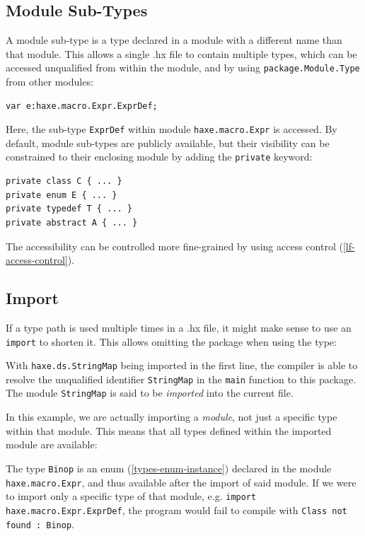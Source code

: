 \documentclass[a4paper,oneside]{book}
\newcommand{\type}[1]{\texttt{#1}}
\newcommand{\expr}[1]{\texttt{#1}}
\newcommand{\tref}[2]{#1 (\ref{#2})}
\newcommand{\haxe}[2][]{%
}
\begin{document}
\subsection{Module Sub-Types}
\label{type-systemmodule-sub-types}

A module sub-type is a type declared in a module with a different name than that module. This allows a single .hx file to contain multiple types, which can be accessed unqualified from within the module, and by using \expr{package.Module.Type} from other modules:

\begin{lstlisting}
var e:haxe.macro.Expr.ExprDef;
\end{lstlisting}
Here, the sub-type \type{ExprDef} within module \expr{haxe.macro.Expr} is accessed. By default, module sub-types are publicly available, but their visibility can be constrained to their enclosing module by adding the \expr{private} keyword:

\begin{lstlisting}
private class C { ... }
private enum E { ... }
private typedef T { ... }
private abstract A { ... }
\end{lstlisting}
The accessibility can be controlled more fine-grained by using \tref{access control}{lf-access-control}.




\subsection{Import}
\label{type-systemimport}

If a type path is used multiple times in a .hx file, it might make sense to use an \expr{import} to shorten it. This allows omitting the package when using the type:

\haxe{assets/Import.hx}

With \expr{haxe.ds.StringMap} being imported in the first line, the compiler is able to resolve the unqualified identifier \expr{StringMap} in the \expr{main} function to this package. The module \type{StringMap} is said to be \emph{imported} into the current file.

In this example, we are actually importing a \emph{module}, not just a specific type within that module. This means that all types defined within the imported module are available:

\haxe{assets/Import2.hx}

The type \type{Binop} is an \tref{enum}{types-enum-instance} declared in the module \type{haxe.macro.Expr}, and thus available after the import of said module. If we were to import only a specific type of that module, e.g. \expr{import haxe.macro.Expr.ExprDef}, the program would fail to compile with \expr{Class not found : Binop}.
\end{document}
